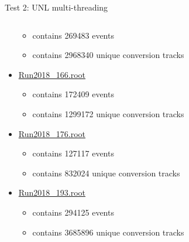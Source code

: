 \documentclass[10pt]{beamer}
\begin{document}
\begin{frame}{Test 2: UNL multi-threading}
\begin{columns}
\begin{column}{0.5\textwidth}
\begin{itemize}
        \begin{itemize}
        \scriptsize
      		\item   contains 269483 events
      		\item   contains 2968340 unique conversion tracks       
        \end{itemize}
   \item \url{Run2018_166.root}
        \begin{itemize}
        \scriptsize
      		 \item  contains 172409 events
       		\item  contains 1299172 unique conversion tracks
        \end{itemize}

    \item \url{Run2018_176.root}
        \begin{itemize}
        \scriptsize
      		\item   contains 127117 events
      		\item   contains 832024 unique conversion tracks
        \end{itemize}
    \item \url{Run2018_193.root}
        \begin{itemize}
        \scriptsize
      		 \item  contains 294125 events
       		\item  contains 3685896 unique conversion tracks 
        \end{itemize}
\end{itemize}
\end{column}
\end{columns}

\end{frame}
\end{document}
